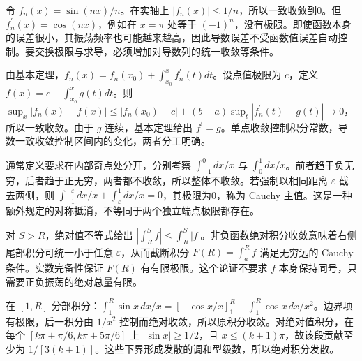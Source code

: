 \documentclass[12pt,fontset=fandol]{ctexart}
\begin{document}
\begin{solve}\label{ans:c30q12}
令 $f_n(x)=\sin(nx)/n$。在实轴上 $|f_n(x)|\le1/n$，所以一致收敛到0。但 $f_n^{\prime}(x)=\cos(nx)$，例如在 $x=\pi$ 处等于 $(-1)^n$，没有极限。即使函数本身的误差很小，其振荡频率也可能越来越高，因此导数误差不受函数值误差自动控制。要交换极限与求导，必须增加对导数列的统一收敛等条件。
\end{solve}

\begin{solve}\label{ans:c30q13}
由基本定理，$f_n(x)=f_n(x_0)+\int_{x_0}^xf_n^{\prime}(t)dt$。设点值极限为 $c$，定义 $f(x)=c+\int_{x_0}^xg(t)dt$。则 $\sup_x|f_n(x)-f(x)|\le|f_n(x_0)-c|+(b-a)\sup_t|f_n^{\prime}(t)-g(t)|\to0$，所以一致收敛。由于 $g$ 连续，基本定理给出 $f^{\prime}=g$。单点收敛控制积分常数，导数一致收敛控制区间内的变化，两者分工明确。
\end{solve}

\begin{solve}\label{ans:c30q14}
通常定义要求在内部奇点处分开，分别考察 $\int_{-1}^0dx/x$ 与 $\int_0^1dx/x$。前者趋于负无穷，后者趋于正无穷，两者都不收敛，所以整体不收敛。若强制以相同距离 $\varepsilon$ 截去两侧，则 $\int_{-1}^{-\varepsilon}dx/x+\int_\varepsilon^1dx/x=0$，其极限为0，称为 Cauchy 主值。这是一种额外规定的对称抵消，不等同于两个独立端点极限都存在。
\end{solve}

\begin{solve}\label{ans:c30q15}
对 $S>R$，绝对值不等式给出 $|\int_R^Sf|\le\int_R^S|f|$。非负函数绝对积分收敛意味着右侧尾部积分可统一小于任意 $\varepsilon$，从而截断积分 $F(R)=\int_a^Rf$ 满足无穷远的 Cauchy 条件。实数完备性保证 $F(R)$ 有有限极限。这个论证不要求 $f$ 本身保持同号，只需要正负振荡的绝对总量有限。
\end{solve}

\begin{solve}\label{ans:c30q16}
在 $[1,R]$ 分部积分：$\int_1^R\sin x\,dx/x=[-\cos x/x]_1^R-\int_1^R\cos x\,dx/x^2$。边界项有极限，后一积分由 $1/x^2$ 控制而绝对收敛，所以原积分收敛。对绝对值积分，在每个 $[k\pi+\pi/6,k\pi+5\pi/6]$ 上 $|\sin x|\ge1/2$，且 $x\le(k+1)\pi$，故该段贡献至少为 $1/[3(k+1)]$。这些下界形成发散的调和型级数，所以绝对积分发散。
\end{solve}
\end{document}
